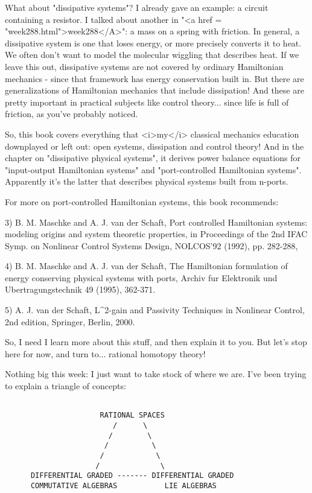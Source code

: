 What about "dissipative systems"?  I already gave an
example: a circuit containing a resistor.  I talked about another in
"<a href = "week288.html">week288</A>": a mass on a spring
with friction.  In general, a dissipative system is one that loses
energy, or more precisely converts it to heat.  We often don't want to
model the molecular wiggling that describes heat.  If we leave this
out, dissipative systems are not covered by ordinary Hamiltonian
mechanics - since that framework has energy conservation built in.
But there are generalizations of Hamiltonian mechanics that include
dissipation!  And these are pretty important in practical subjects
like control theory... since life is full of friction, as you've
probably noticed.

So, this book covers everything that <i>my</i> classical mechanics
education downplayed or left out: open systems, dissipation and
control theory!  And in the chapter on "dissipative physical
systems", it derives power balance equations for
"input-output Hamiltonian systems" and "port-controlled
Hamiltonian systems".  Apparently it's the latter that describes
physical systems built from n-ports.  

For more on port-controlled Hamiltonian systems, this book recommends:

3) B. M. Maschke and A. J. van der Schaft, Port controlled Hamiltonian
systems: modeling origins and system theoretic properties, in
Proceedings of the 2nd IFAC Symp. on Nonlinear Control Systems Design,
NOLCOS'92 (1992), pp. 282-288,

4) B. M. Maschke and A. J. van der Schaft, The Hamiltonian formulation
of energy conserving physical systems with ports, Archiv fur
Elektronik und Ubertragungstechnik 49 (1995), 362-371.

5) A. J. van der Schaft, L^{2}-gain and Passivity Techniques in
Nonlinear Control, 2nd edition, Springer, Berlin, 2000.

So, I need I learn more about this stuff, and then explain it to you.
But let's stop here for now, and turn to... rational homotopy theory!

Nothing big this week: I just want to take stock of where we are.
I've been trying to explain a triangle of concepts:


\begin{verbatim}

                      RATIONAL SPACES
                         /      \  
                        /        \  
                       /          \  
                      /            \
                     /              \
      DIFFERENTIAL GRADED ------- DIFFERENTIAL GRADED
      COMMUTATIVE ALGEBRAS           LIE ALGEBRAS
\end{verbatim}
    

